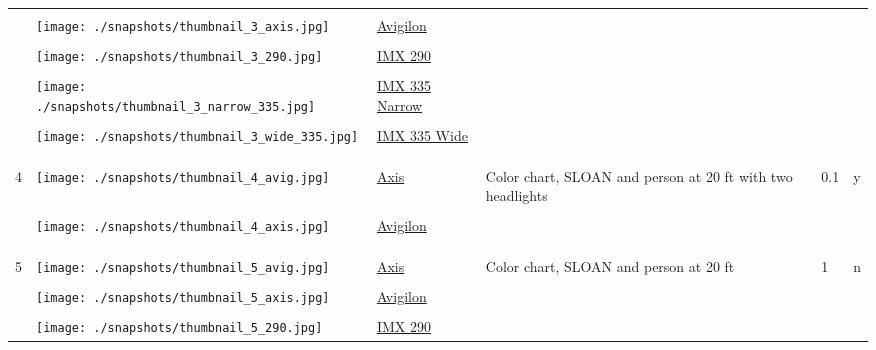 \documentclass{article}%
\begin{document}
\begin{longtabu}{m{2.5cm} m{4cm} m{2cm} m{4cm} m{2cm} m{2cm}}
&&&&&\\%
&\texttt{[image: ./snapshots/thumbnail\_3\_axis.jpg]}&\href{https://drive.google.com/file/d/1q6gqBQ6S1FwtAiRq4IqMP8QIOxCVgdUm/view?usp=sharing}{Avigilon}&&&\\%
&&&&&\\%
&\texttt{[image: ./snapshots/thumbnail\_3\_290.jpg]}&\href{https://drive.google.com/file/d/1-f0GmT8ISstMWtPluwlpYSEjW-PEKy6G/view?usp=sharing}{IMX 290}&&&\\%
&&&&&\\%
&\texttt{[image: ./snapshots/thumbnail\_3\_narrow\_335.jpg]}&\href{https://drive.google.com/file/d/118Ikvzhi-AxQ9M3h6NEk44gCdTZtthgE/view?usp=sharing}{IMX 335 Narrow}&&&\\%
&&&&&\\%
&\texttt{[image: ./snapshots/thumbnail\_3\_wide\_335.jpg]}&\href{https://drive.google.com/file/d/15LOlQBbfMQFXythqIFHXFbSU2_Lcecz3/view?usp=sharing}{IMX 335 Wide}&&&\\%
&&&&&\\%
&&&&&\\%
\hline%
&&&&&\\%
4&\texttt{[image: ./snapshots/thumbnail\_4\_avig.jpg]}&\href{https://drive.google.com/file/d/1D2tFavb6tvWkyqXF9d36gFK9kObfAqQG/view?usp=sharing}{Axis}&Color chart, SLOAN and person at 20 ft with two headlights&0.1&y\\%
&&&&&\\%
&\texttt{[image: ./snapshots/thumbnail\_4\_axis.jpg]}&\href{https://drive.google.com/file/d/1j0_TzJFfktBd_8HYTTIBMHNd07P60b8u/view?usp=sharing}{Avigilon}&&&\\%
&&&&&\\%
&&&&&\\%
\hline%
&&&&&\\%
5&\texttt{[image: ./snapshots/thumbnail\_5\_avig.jpg]}&\href{https://drive.google.com/file/d/18tryp1T-Yq1Pr2vNXBt2vCDzVUe_sWjN/view?usp=sharing}{Axis}&Color chart, SLOAN and person at 20 ft&1&n\\%
&&&&&\\%
&\texttt{[image: ./snapshots/thumbnail\_5\_axis.jpg]}&\href{https://drive.google.com/file/d/1uKAi8Vf5jjoS4yQaUYb4f7UBP877URnU/view?usp=sharing}{Avigilon}&&&\\%
&&&&&\\%
&\texttt{[image: ./snapshots/thumbnail\_5\_290.jpg]}&\href{https://drive.google.com/file/d/1Y-eCRi_fKYXgy8hXca5ltbo7CeTw16UG/view?usp=sharing}{IMX 290}&&&\\%

\end{longtabu}
\end{document}
